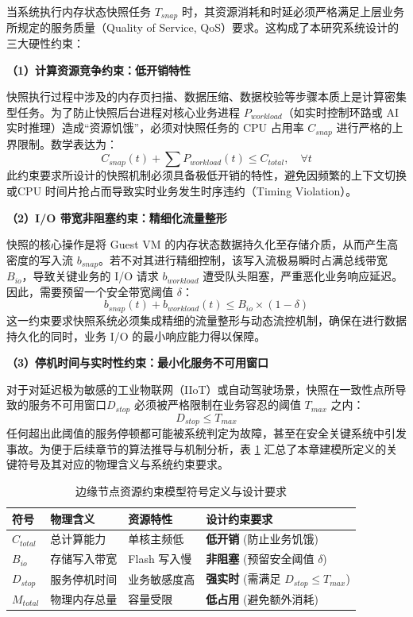 当系统执行内存状态快照任务 $T_{snap}$ 时，其资源消耗和时延必须严格满足上层业务所规定的服务质量（Quality of Service, QoS）要求。这构成了本研究系统设计的三大硬性约束：

\textbf{（1）计算资源竞争约束：低开销特性}

快照执行过程中涉及的内存页扫描、数据压缩、数据校验等步骤本质上是计算密集型任务。为了防止快照后台进程对核心业务进程 $P_{workload}$（如实时控制环路或 AI 实时推理）造成“资源饥饿”，必须对快照任务的 CPU 占用率 $C_{snap}$ 进行严格的上界限制。数学表达为：
$$C_{snap}(t) + \sum P_{workload}(t) \le C_{total}, \quad \forall t$$
此约束要求所设计的快照机制必须具备极低开销的特性，避免因频繁的上下文切换或CPU 时间片抢占而导致实时业务发生时序违约（Timing Violation）。

\textbf{（2）I/O 带宽非阻塞约束：精细化流量整形}

快照的核心操作是将 Guest VM 的内存状态数据持久化至存储介质，从而产生高密度的写入流 $b_{snap}$。若不对其进行精细控制，该写入流极易瞬时占满总线带宽 $B_{io}$，导致关键业务的 I/O 请求 $b_{workload}$ 遭受队头阻塞，严重恶化业务响应延迟。因此，需要预留一个安全带宽阈值 $\delta$：
$$b_{snap}(t) + b_{workload}(t) \le B_{io} \times (1 - \delta)$$
这一约束要求快照系统必须集成精细的流量整形与动态流控机制，确保在进行数据持久化的同时，业务 I/O 的最小响应能力得以保障。

\textbf{（3）停机时间与实时性约束：最小化服务不可用窗口}

对于对延迟极为敏感的工业物联网（IIoT）或自动驾驶场景，快照在一致性点所导致的服务不可用窗口$D_{stop}$ 必须被严格限制在业务容忍的阈值 $T_{max}$ 之内：$$D_{stop} \le T_{max}$$任何超出此阈值的服务停顿都可能被系统判定为故障，甚至在安全关键系统中引发事故。为便于后续章节的算法推导与机制分析，表 \ref{tab:resource_constraints} 汇总了本章建模所定义的关键符号及其对应的物理含义与系统约束要求。

\begin{table}[htbp]
    \centering
    \caption{边缘节点资源约束模型符号定义与设计要求}
    \label{tab:resource_constraints}
    \renewcommand{\arraystretch}{1.2}
    \setlength{\tabcolsep}{6pt}
    \begin{tabular}{l l l l}
        \toprule
        \textbf{符号} & \textbf{物理含义} & \textbf{资源特性} & \textbf{设计约束要求} \\
        \midrule
        $C_{total}$ & 
        总计算能力 & 
        单核主频低 & 
        \textbf{低开销} (防止业务饥饿) \\
        
        $B_{io}$ & 
        存储写入带宽 & 
        Flash 写入慢 & 
        \textbf{非阻塞} (预留安全阈值 $\delta$) \\
        
        $D_{stop}$ & 
        服务停机时间 & 
        业务敏感度高 & 
        \textbf{强实时} (需满足 $D_{stop} \le T_{max}$) \\
        
        $M_{total}$ & 
        物理内存总量 & 
        容量受限 & 
        \textbf{低占用} (避免额外消耗) \\
        \bottomrule
    \end{tabular}
\end{table}

